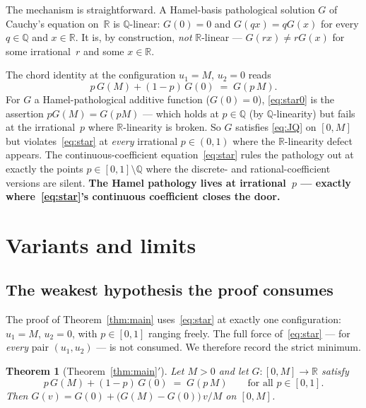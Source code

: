 \documentclass[11pt,a4paper]{amsart}
\newtheorem{theorem}{Theorem}
\newcommand{\R}{\mathbb R}
\newcommand{\Q}{\mathbb Q}
\begin{document}
The mechanism is straightforward. A Hamel-basis pathological solution $G$
of Cauchy's equation on~$\R$ is $\Q$-linear: $G(0)=0$ and $G(qx) = qG(x)$
for every $q\in\Q$ and $x\in\R$. It is, by construction, \emph{not}
$\R$-linear --- $G(rx)\neq rG(x)$ for some irrational~$r$ and some
$x\in\R$.

The chord identity at the configuration $u_1=M$, $u_2=0$ reads
\begin{equation}
p\,G(M) + (1-p)\,G(0) \;=\; G(p\,M).
\tag{$\star_0$}\label{eq:star0}
\end{equation}
For $G$ a Hamel-pathological additive function ($G(0)=0$),
\eqref{eq:star0} is the assertion $pG(M) = G(pM)$ --- which holds at
$p\in\Q$ (by $\Q$-linearity) but fails at the irrational~$p$ where
$\R$-linearity is broken. So $G$ satisfies \eqref{eq:JQ} on $[0,M]$ but
violates~\eqref{eq:star} at \emph{every} irrational $p\in(0,1)$ where the
$\R$-linearity defect appears. The continuous-coefficient
equation~\eqref{eq:star} rules the pathology out at exactly the points
$p\in[0,1]\setminus\Q$ where the discrete- and rational-coefficient versions
are silent. \textbf{The Hamel pathology lives at irrational~$p$ --- exactly
where~\eqref{eq:star}'s continuous coefficient closes the door.}

\section{Variants and limits}
\label{sec:variants}

\subsection{The weakest hypothesis the proof consumes}
\label{ssec:weak}

The proof of Theorem~\ref{thm:main} uses~\eqref{eq:star} at exactly one
configuration: $u_1=M$, $u_2=0$, with $p\in[0,1]$ ranging freely. The full
force of~\eqref{eq:star} --- for \emph{every} pair $(u_1,u_2)$ --- is not
consumed. We therefore record the strict minimum.

\begin{theorem}[Theorem~\ref{thm:main}$'$]
\label{thm:main-prime}
Let $M>0$ and let $G\colon[0,M]\to\R$ satisfy
\[
p\,G(M) + (1-p)\,G(0) \;=\; G(p\,M)
\qquad \text{for all } p\in[0,1].
\]
Then $G(v) = G(0) + \bigl(G(M)-G(0)\bigr)\,v/M$ on $[0,M]$.
\end{theorem}
\end{document}

